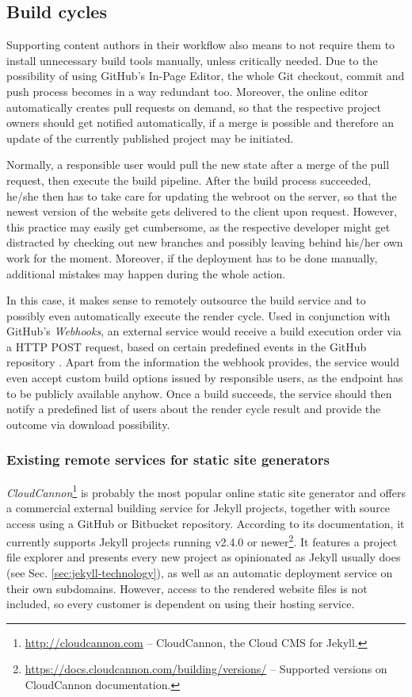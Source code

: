 \subsection{Build cycles}
\label{sec:solutions-remotebuilding}

Supporting content authors in their workflow also means to not require them to install unnecessary build tools manually, unless critically needed. Due to the possibility of using GitHub's In-Page Editor, the whole Git checkout, commit and push process becomes in a way redundant too. Moreover, the online editor automatically creates pull requests on demand, so that the respective project owners should get notified automatically, if a merge is possible and therefore an update of the currently published project may be initiated.

Normally, a responsible user would pull the new state after a merge of the pull request, then execute the build pipeline. After the build process succeeded, he/she then has to take care for updating the webroot on the server, so that the newest version of the website gets delivered to the client upon request. However, this practice may easily get cumbersome, as the respective developer might get distracted by checking out new branches and possibly leaving behind his/her own work for the moment. Moreover, if the deployment has to be done manually, additional mistakes may happen during the whole action.

In this case, it makes sense to remotely outsource the build service and to possibly even automatically execute the render cycle. Used in conjunction with GitHub's \emph{Webhooks}, an external service would receive a build execution order via a HTTP POST request, based on certain predefined events in the GitHub repository \cite{GithubWebhooks}. Apart from the information the webhook provides, the service would even accept custom build options issued by responsible users, as the endpoint has to be publicly available anyhow. Once a build succeeds, the service should then notify a predefined list of users about the render cycle result and provide the outcome via download possibility.

\subsubsection{Existing remote services for static site generators}
\emph{CloudCannon}\footnote{\url{http://cloudcannon.com} -- CloudCannon, the Cloud CMS for Jekyll.} is probably the most popular online static site generator and offers a commercial external building service for Jekyll projects, together with source access using a GitHub or Bitbucket repository. According to its documentation, it currently supports Jekyll projects running v2.4.0 or newer\footnote{\url{https://docs.cloudcannon.com/building/versions/} -- Supported versions on CloudCannon documentation.}. It features a project file explorer and presents every new project as opinionated as Jekyll usually does (see Sec. \ref{sec:jekyll-technology}), as well as an automatic deployment service on their own subdomains. However, access to the rendered website files is not included, so every customer is dependent on using their hosting service.

